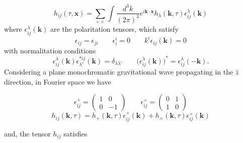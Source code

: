 \documentclass[11pt,a4paper,twoside]{book}
\begin{document}
\begin{equation}
	\label{fouriewrh}
	h_{ij}(\tau,\textbf{x}) = \sum_{+\times} \int \frac{d^{3} k}{(2\pi)^{3}}e^{i\textbf{k}\cdot \textbf{x}}h_{\lambda}(\textbf{k},\tau)\epsilon^{\lambda}_{ij}(\textbf{k})
\end{equation}
where $ \epsilon^{\lambda}_{ij}(\textbf{k}) $ are the polaritation tensors, which satisfy
\begin{equation}
	\epsilon_{ij}=\epsilon_{ji} \qquad \epsilon^{i}_{i}=0 \qquad  k^{i}\epsilon_{ij}(\textbf{k}) =0
\end{equation}
 with normalitation conditions
 \begin{equation}
 \epsilon_{ij}^{\lambda}(\textbf{k})\epsilon^{*ij}_{\lambda'}(\textbf{k})=\delta_{\lambda\lambda'}
 \qquad
 \big (\epsilon_{ij}^{\lambda}(\textbf{k})\big)^{*} = \epsilon_{ij}^{\lambda}(-\textbf{k}).
 \end{equation}
Considering a plane monochromatic gravitational wave propagating in the $\hat{z}$ direction, in Fourier space we have

\begin{equation}
	\epsilon^{+}_{ij} = 
	\begin{pmatrix}
		1 & 0 \\
		0 & -1
	\end{pmatrix}
\qquad
\epsilon^{\times}_{ij} = 
\begin{pmatrix}
	0 & 1 \\
	1 & 0
\end{pmatrix}
\end{equation}
\begin{equation}
	h_{ij}(\textbf{k},\tau) = h_{+}(\textbf{k},\tau)\epsilon_{ij}^{+}(\textbf{k}) + 
	h_{\times}(\textbf{k},\tau)\epsilon_{ij}^{\times}(\textbf{k})
\end{equation}

and, the tensor $ h_{ij} $ satisfies
\end{document}
